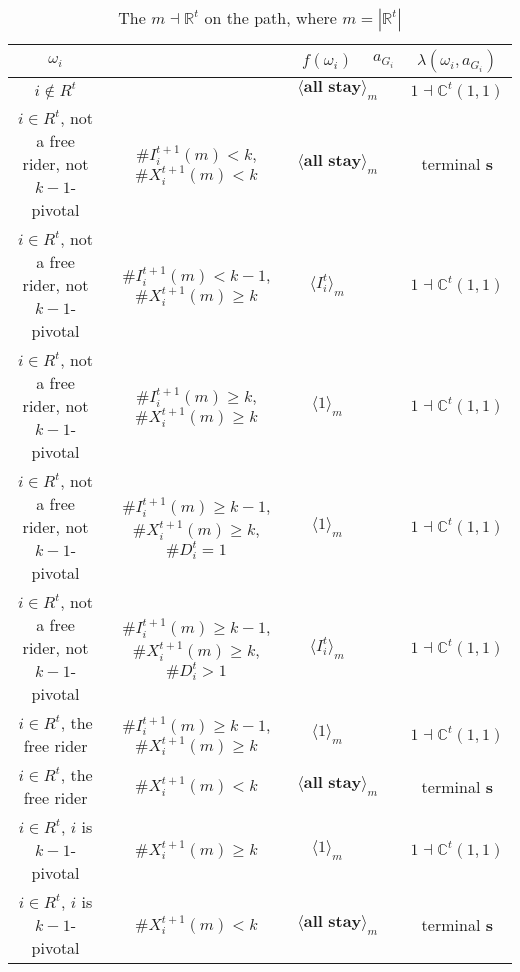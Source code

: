 \documentclass[12pt,letter]{article}
\newcommand{\Kappa}{\mathbb{C}}
\newcommand{\Omicron}{\mathbb{R}}
\theoremstyle{definition}
\theoremstyle{remark}
\theoremstyle{claim}
\begin{document}
\begin{landscape}
\begin{table}[!htbp]
\caption{The $m\dashv\Omicron^t$ on the path, where $m=|\Omicron^t|$}
\label{table:eqm_path_ot2}
\begin{center}
\begin{tabular}{c c | c | c | c}
$\omega_i$ 	 & 	   &	$f(\omega_i)$  &	$a_{G_i}$ & $\lambda(\omega_i,a_{G_i})$ \\
\hline
\hline
$i\notin R^t$  	& 								& $\langle \textbf{all stay} \rangle_m$		&  			& $1\dashv \Kappa^t(1,1)$ \\
$i\in R^t$, not a free rider, not $k-1$-pivotal		 	&  $\#I^{t+1}_i(m)< k$, $\#X^{t+1}_i(m)<k$			&  $\langle \textbf{all stay} \rangle_m$	& 	& terminal \textbf{s} \\
$i\in R^t$, not a free rider, not $k-1$-pivotal	  	& $\#I^{t+1}_i(m)<k-1$, $\#X^{t+1}_i(m)\geq k$		    & $\langle I^t_i \rangle_m$ 		&    			& $1\dashv \Kappa^t(1,1)$ \\
$i\in R^t$, not a free rider, not $k-1$-pivotal	 	&  $\#I^{t+1}_i(m)\geq k$, $\#X^{t+1}_i(m)\geq k$	& $\langle 1 \rangle_m$ 	& 	& $1\dashv \Kappa^t(1,1)$ \\
$i\in R^t$, not a free rider, not $k-1$-pivotal	 	&  $\#I^{t+1}_i(m)\geq k-1$, $\#X^{t+1}_i(m)\geq k$, $\#D^t_i=1$	& $\langle 1 \rangle_m$ 	& 	& $1\dashv \Kappa^t(1,1)$ \\
$i\in R^t$, not a free rider, not $k-1$-pivotal	 	&  $\#I^{t+1}_i(m)\geq k-1$, $\#X^{t+1}_i(m)\geq k$, $\#D^t_i>1$	& $\langle I^t_i \rangle_m$ 	& 	& $1\dashv \Kappa^t(1,1)$ \\
$i\in R^t$, the free rider  	&  $\#I^{t+1}_i(m)\geq k-1$, $\#X^{t+1}_i(m)\geq k$ & $\langle 1 \rangle_m$ 		& 				  & $1\dashv \Kappa^t(1,1)$ \\
$i\in R^t$, the free rider  	&  		$\#X^{t+1}_i(m)<k$					&  $\langle \textbf{all stay} \rangle_m$		& 										  & terminal \textbf{s} \\
$i\in R^t$, $i$ is $k-1$-pivotal  	&  $\#X^{t+1}_i(m)\geq k$ & $\langle 1 \rangle_m$ 	& 											 & $1\dashv \Kappa^t(1,1)$ \\
$i\in R^t$, $i$ is $k-1$-pivotal  	&  	$\#X^{t+1}_i(m)<k$		&  $\langle \textbf{all stay} \rangle_m$	& 											 & terminal \textbf{s} \\
\hline
\end{tabular}
\end{center}
\end{table}


\end{landscape}
\end{document}
